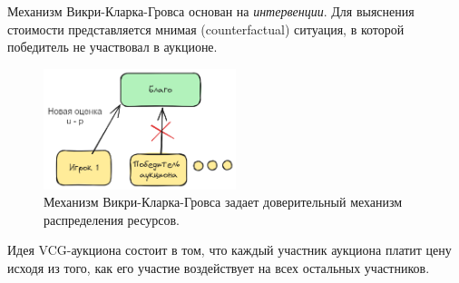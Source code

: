 Механизм Викри-Кларка-Гровса основан на \textit{интервенции}. Для выяснения стоимости представляется мнимая (counterfactual) ситуация, в которой победитель не участвовал в аукционе.

\begin{figure}[h]
    \centering
    \includegraphics[width=0.5\textwidth]{assets/mechanism/vcg.excalidraw.png}
    \caption{Механизм Викри-Кларка-Гровса задает доверительный механизм распределения ресурсов.}
    \label{mech}
\end{figure}


 Идея VCG-аукциона состоит в том, что каждый участник аукциона платит цену исходя из того, как его участие воздействует на всех остальных участников. 